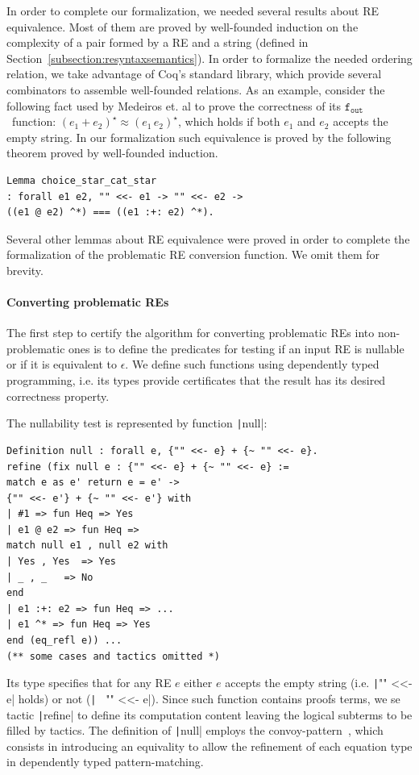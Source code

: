 \documentclass[oneside,12pt]{scrbook}
\theoremstyle{definition}
\newcommand{\fout}{\ensuremath{\texttt{f$_{\texttt{out}}$}}}
\newcommand{\coq}[1]{\texttt|#1|}
\theoremstyle{plain}
\theoremstyle{definition}
\begin{document}
In order to complete our formalization, we needed several results about RE
equivalence. Most of them are proved by well-founded induction on the complexity
of a pair formed by a RE and a string (defined in Section~\ref{subsection:resyntaxsemantics}).
In order to formalize the needed ordering relation, we take advantage of Coq's
standard library, which provide several combinators to assemble well-founded
relations. As an example, consider the following fact used by Medeiros et. al to
prove the correctness of its \fout~function: $(e_1 + e_2)^\star \approx
(e_1\,e_2)^\star$, which holds if both $e_1$ and $e_2$ accepts the empty string.
In our formalization such equivalence is proved by the following theorem proved
by well-founded induction.

\begin{verbatim}
Lemma choice_star_cat_star 
: forall e1 e2, "" <<- e1 -> "" <<- e2 ->
((e1 @ e2) ^*) === ((e1 :+: e2) ^*). 

\end{verbatim}
Several other lemmas about RE equivalence were proved in order to complete
the formalization of the problematic RE conversion function. We omit them
for brevity.

\paragraph{Converting problematic REs} The first step to certify the algorithm
for converting problematic REs into non-problematic ones is to define the
predicates for testing if an input RE is nullable or if it is equivalent to
$\epsilon$. We define such functions using dependently typed programming, i.e.
its types provide certificates that the result has its desired correctness
property.

The nullability test is represented by function \coq{null}:
\begin{verbatim}
Definition null : forall e, {"" <<- e} + {~ "" <<- e}.
refine (fix null e : {"" <<- e} + {~ "" <<- e} :=
match e as e' return e = e' -> 
{"" <<- e'} + {~ "" <<- e'} with
| #1 => fun Heq => Yes
| e1 @ e2 => fun Heq =>
match null e1 , null e2 with
| Yes , Yes  => Yes
| _ , _   => No
end 
| e1 :+: e2 => fun Heq => ...
| e1 ^* => fun Heq => Yes
end (eq_refl e)) ...
(** some cases and tactics omitted *)
\end{verbatim}
Its type specifies that for any RE $e$ either $e$ accepts the empty string (i.e.
\coq{"" <<- e} holds) or not (\coq{~ "" <<- e}). Since such function contains
proofs terms, we se tactic \coq{refine} to define its computation content
leaving the logical subterms to be filled by tactics. The definition of
\coq{null} employs the convoy-pattern~\cite{Chlipala13}, which consists in
introducing an equivality to allow the refinement of each equation type in
dependently typed pattern-matching.
\end{document}
